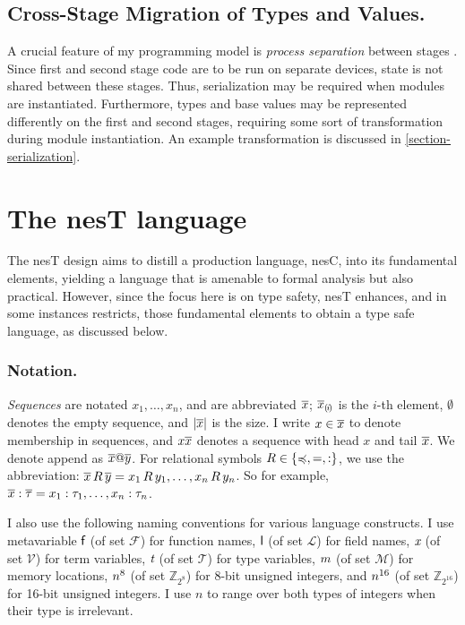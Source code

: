 \subsection{Cross-Stage Migration of Types and Values.} 

A crucial feature of my programming model is \emph{process separation} between stages
\cite{FramedML}. Since first and second stage code are to be run on separate devices, state is
not shared between these stages. Thus, serialization may be required when modules are
instantiated. Furthermore, types and base values may be represented differently on the first and
second stages, requiring some sort of transformation during module instantiation. An example
transformation is discussed in \autoref{section-serialization}.

\section{The nesT language}
\label{section-nest}
 
\syntaxfig

The nesT design aims to distill a production language, nesC, into its fundamental elements,
yielding a language that is amenable to formal analysis but also practical. However, since the
focus here is on type safety, nesT enhances, and in some instances restricts, those fundamental
elements to obtain a type safe language, as discussed below.

\subsubsection{Notation.} \emph{Sequences} are notated $x_1,\ldots,x_n$, and are abbreviated
$\overline{x}$; $\overline{x}_{(\mskip -2.5mu i\mskip -2.5mu)}$ is the $i$-th element, $\emptyset$ denotes the empty sequence,
and $|\overline{x}|$ is the size. I write $x \in \overline{x}$ to denote membership in sequences,
and $x\overline{x}$ denotes a sequence with head $x$ and tail $\overline{x}$. We denote append as
$\overline{x}@\overline{y}$. For relational symbols $R \in \{ \preccurlyeq, =, : \}$, we use the
abbreviation: $\overline{x}\, R\, \overline{y} = x_1\, R\, y_1, \ldots, x_n\, R\, y_n$. So for example,
$\overline{x} : \overline{\tau} = x_1 : \tau_1,\ldots,x_n : \tau_n$.

I also use the following naming conventions for various language constructs. I use metavariable
$\textsf{f}$ (of set $\mathcal{F}$) for function names, $\textsf{l}$ (of set $\mathcal{L}$) for field
names, $\textit{x}$ (of set $\mathcal{V}$) for term variables, $\textit{t}$ (of set $\mathcal{T}$) for type
variables, $ m$ (of set $\mathcal{M}$) for memory locations, $n^{8}$ (of set
$\mathbb{Z}_{2^8}$) for 8-bit unsigned integers, and $n^{16}$ (of set $\mathbb{Z}_{2^{16}}$)
for 16-bit unsigned integers. I use $n$ to range over both types of integers when their type is
irrelevant.

